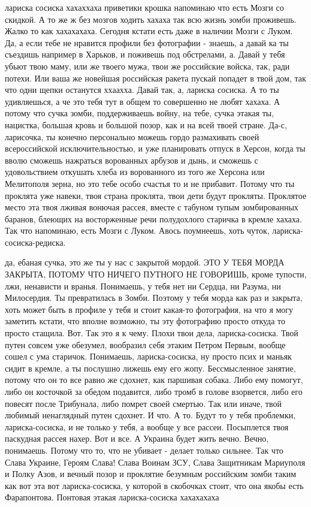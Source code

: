 лариска сосиска хахаххаха приветики крошка напоминаю что есть Мозги со скидкой.
А то же ж без мозгов ходить хахаха так всю жизнь зомби проживешь. Жалко то как
хахахахаха. Сегодня кстати есть даже в наличии Мозги с Луком. Да, а если тебе
не нравится профили без фотографии - знаешь, а давай ка ты съездишь например в
Харьков, и поживешь под обстрелами, а. Давай у тебя убьют твою маму, или же
твоего мужа, твои же российские войска, так, ради потехи. Или ваша же новейшая
российская ракета пускай попадет в твой дом, так что одни щепки останутся
ххаахха. Давай так, а, лариска сосиска. А то ты удивляешься, а че это тебя тут
в общем то совершенно не любят хахаха. А потому что сучка зомби, поддерживаешь
войну, на тебе, сучка этакая ты, нацистка, большая кровь и большой позор, как и
на всей твоей стране. Да-с, ларисочка, ты конечно персонально можешь гордо
размахивать своей всероссийской исключительностью, и уже планировать отпуск в
Херсон, когда ты вволю сможешь нажраться ворованных арбузов и дынь, и сможешь с
удовольствием откушать хлеба из ворованного из того же Херсона или Мелитополя
зерна, но это тебе особо счастья то и не прибавит. Потому что ты проклята уже
навеки, твоя страна проклята, твои дети будут прокляты. Проклятое место эта
твоя лживая вонючая рассея, вместе с табуном тупым зомбированных баранов,
блеющих на восторженные речи полудохлого старичка в кремле хахаха. Так что
напоминаю, есть Мозги с Луком. Авось поумнеешь, хоть чуток,
лариска-сосиска-редиска.

да, ебаная сучка, это же ты у нас с закрытой мордой. ЭТО У ТЕБЯ МОРДА ЗАКРЫТА,
ПОТОМУ ЧТО НИЧЕГО ПУТНОГО НЕ ГОВОРИШЬ, кроме тупости, лжи, ненависти и вранья.
Понимаешь, у тебя нет ни Сердца, ни Разума, ни Милосердия. Ты превратилась в
Зомби. Поэтому у тебя морда как раз и закрыта, хоть может быть в профиле у тебя
и стоит какая-то фотография, на что я могу заметить кстати, что вполне
возможно, ты эту фотографию просто откуда то просто стащила. Вот. Так это я к
чему. Плохи твои дела, лариска-сосиска. Твой путен совсем уже обезумел,
вообразил себя этаким Петром Первым, вообще сошел с ума старичок. Понимаешь,
лариска-сосиска, ну просто псих и маньяк сидит в кремле, а ты послушно лижешь
ему его жопу. Бессмысленное занятие, потому что он то все равно же сдохнет, как
паршивая собака. Либо ему помогут, либо он косточкой за обедом подавится, либо
тромб в голове взорвется, либо его повесят после Трибунала, либо помрет своей
смертью. Так или иначе, твой любимый ненаглядный путен сдохнет. И что. А то.
Будут то у тебя проблемки, лариска-сосиска, и не только у тебя, а вообще у все
рассеи. Посыплется твоя паскудная рассея нахер. Вот и все. А Украина будет жить
вечно. Вечно, понимаешь. Потому что то, что не убивает - делает только сильнее.
Так что Слава Украине, Героям Слава! Слава Воинам ЗСУ, Слава Защитникам
Мариуполя и Полку Азов, и вечный позор и проклятие безумным российским зомби
таким как вот эта вот лариска-сосиска, у которой в скобочках стоит, что она
якобы есть Фарапонтова. Понтовая этакая лариска-сосиска хахахахаха

